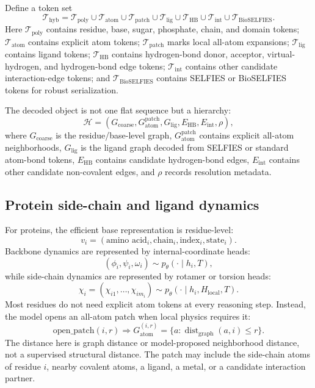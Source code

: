 \documentclass[11pt]{article}
\newcommand{\bioselfies}{\mathrm{BioSELFIES}}
\begin{document}
Define a token set
\[
\mathcal{T}_{\mathrm{hyb}}
=
\mathcal{T}_{\mathrm{poly}}
\cup
\mathcal{T}_{\mathrm{atom}}
\cup
\mathcal{T}_{\mathrm{patch}}
\cup
\mathcal{T}_{\mathrm{lig}}
\cup
\mathcal{T}_{\mathrm{HB}}
\cup
\mathcal{T}_{\mathrm{int}}
\cup
\mathcal{T}_{\bioselfies}.
\]
Here $\mathcal{T}_{\mathrm{poly}}$ contains residue, base, sugar, phosphate, chain, and domain tokens; $\mathcal{T}_{\mathrm{atom}}$ contains explicit atom tokens; $\mathcal{T}_{\mathrm{patch}}$ marks local all-atom expansions; $\mathcal{T}_{\mathrm{lig}}$ contains ligand tokens; $\mathcal{T}_{\mathrm{HB}}$ contains hydrogen-bond donor, acceptor, virtual-hydrogen, and hydrogen-bond edge tokens; $\mathcal{T}_{\mathrm{int}}$ contains other candidate interaction-edge tokens; and $\mathcal{T}_{\bioselfies}$ contains SELFIES or BioSELFIES tokens for robust serialization.

The decoded object is not one flat sequence but a hierarchy:
\[
\mathcal{H}
=
\left(
G_{\mathrm{coarse}},
G_{\mathrm{atom}}^{\mathrm{patch}},
G_{\mathrm{lig}},
E_{\mathrm{HB}},
E_{\mathrm{int}},
\rho
\right),
\]
where $G_{\mathrm{coarse}}$ is the residue/base-level graph, $G_{\mathrm{atom}}^{\mathrm{patch}}$ contains explicit all-atom neighborhoods, $G_{\mathrm{lig}}$ is the ligand graph decoded from SELFIES or standard atom-bond tokens, $E_{\mathrm{HB}}$ contains candidate hydrogen-bond edges, $E_{\mathrm{int}}$ contains other candidate non-covalent edges, and $\rho$ records resolution metadata.

\subsection{Protein side-chain and ligand dynamics}

For proteins, the efficient base representation is residue-level:
\[
v_i=(\text{amino acid}_i,\text{chain}_i,\text{index}_i,\text{state}_i).
\]
Backbone dynamics are represented by internal-coordinate heads:
\[
(\phi_i,\psi_i,\omega_i)\sim p_\theta(\cdot\mid h_i,T),
\]
while side-chain dynamics are represented by rotamer or torsion heads:
\[
\chi_i=(\chi_{i1},\dots,\chi_{im_i})
\sim p_\theta(\cdot\mid h_i,H_{\mathrm{local}},T).
\]
Most residues do not need explicit atom tokens at every reasoning step. Instead, the model opens an all-atom patch when local physics requires it:
\[
\mathrm{open\_patch}(i,r)
\Rightarrow
G_{\mathrm{atom}}^{(i,r)}
=
\{a:\operatorname{dist}_{\mathrm{graph}}(a,i)\le r\}.
\]
The distance here is graph distance or model-proposed neighborhood distance, not a supervised structural distance. The patch may include the side-chain atoms of residue $i$, nearby covalent atoms, a ligand, a metal, or a candidate interaction partner.
\end{document}
